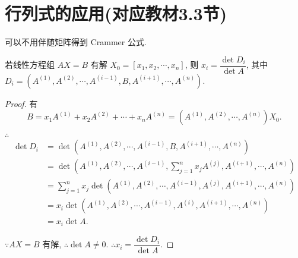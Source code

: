 \documentclass{ctexart}
\begin{document}
\section{行列式的应用(对应教材3.3节)}
可以不用伴随矩阵得到 Crammer 公式.
\begin{theorem}[书上的定理 2]
    若线性方程组 $AX=B$ 有解 $X_0=[x_1,x_2,\cdots,x_n]$, 则 $x_i=\dfrac{\det D_i}{\det A}$, 其中 $D_i=(A^{(1)},A^{(2)},\cdots,A^{(i-1)},B,A^{(i+1)},\cdots,A^{(n)})$.
\end{theorem}
\begin{proof}    
    有
    \[B=x_1A^{(1)}+x_2A^{(2)}+\cdots+x_nA^{(n)}=(A^{(1)},A^{(2)},\cdots,A^{(n)})X_0.\]

    $\therefore$
    \begin{align*}
        \det D_i & =\det\left(A^{(1)},A^{(2)},\cdots,A^{(i-1)},B,A^{(i+1)},\cdots,A^{(n)}\right) \\
        & =\det\left(A^{(1)},A^{(2)},\cdots,A^{(i-1)},\sum\limits_{j=1}^nx_jA^{(j)},A^{(i+1)},\cdots,A^{(n)}\right) \\
        & =\sum\limits_{j=1}^nx_j\det\left(A^{(1)},A^{(2)},\cdots,A^{(i-1)},A^{(j)},A^{(i+1)},\cdots,A^{(n)}\right) \\
        & =x_i\det\left(A^{(1)},A^{(2)},\cdots,A^{(i-1)},A^{(i)},A^{(i+1)},\cdots,A^{(n)}\right) \\
        & =x_i\det A.
    \end{align*}

    $\because AX=B$ 有解, $\therefore\det A\neq0$. $\therefore x_i=\dfrac{\det D_i}{\det A}$.
\end{proof}
\end{document}
